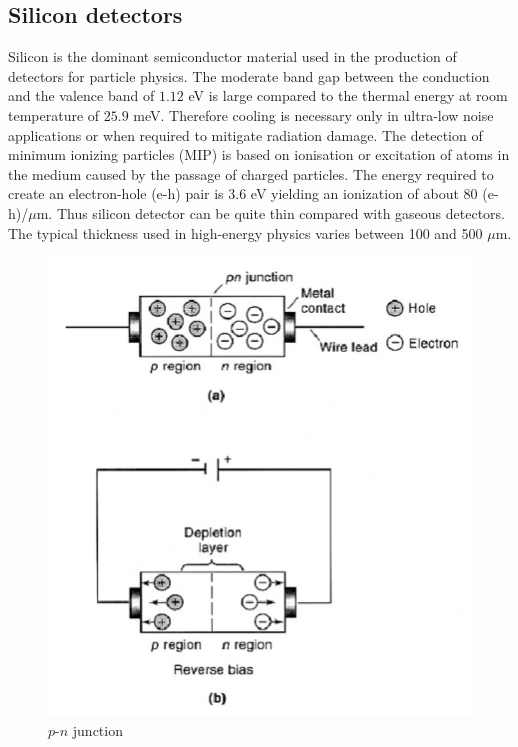 \subsection{Silicon detectors}

Silicon is the dominant semiconductor material used in the production of
detectors for particle physics. The moderate band gap between the conduction
and the valence band of $1.12$ eV is large compared to the thermal
energy at room temperature of $25.9$ meV. Therefore cooling is necessary
only in ultra-low noise applications or when required to mitigate radiation
damage. The detection of minimum ionizing particles (MIP) is based on
ionisation or excitation of atoms in the medium caused by the passage of
charged particles. The energy required to create an electron-hole (e-h) pair
is $3.6$ eV yielding an ionization of about 80 (e-h)/$\mu$m. Thus silicon
detector can be quite thin compared with gaseous detectors. The typical
thickness used in high-energy physics varies between 100 and 500 $\mu$m.

\bigbreak

\begin{figure}[h]
  \centering
  \includegraphics[scale=.25]{img/depletion.png}
  \caption{$p$-$n$ junction}
  \label{chain}
\end{figure}

